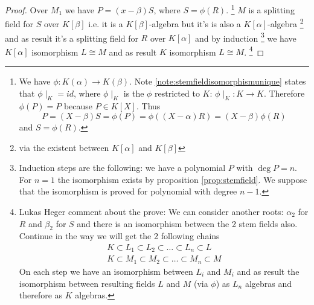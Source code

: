 \begin{theorem}
\begin{proof}
    Over $M_1$ we have $P = (x - \beta) S$, where
    $S = \phi\left(R\right)$.
    \footnote{
      We have $\phi: K\left(\alpha\right) \to
      K\left(\beta\right)$. Note \ref{note:stemfieldisomorphismunique}
      states that $\phi\mid_K = id$, where $\phi\mid_K$ is the $\phi$
      restricted to $K$: $\phi\mid_K : K \to K$.
      Therefore
      $\phi\left(P\right) = P$ because $P \in K\left[X\right]$.
      Thus
      \[
      P = (X - \beta) S = \phi\left(P\right) =
      \phi\left((X - \alpha) R\right) =
      (X - \beta) \phi\left(R\right)
      \]
      and $S = \phi\left(R\right)$.
    }
    $M$ is a splitting field for $S$ over $K\left[\beta\right]$
    i.e. it is a $K\left[\beta\right]$-algebra but it's is also
    a $K\left[\alpha\right]$-algebra
    \footnote{
      via
      the existent 
      between $K\left[\alpha\right]$ and $K\left[\beta\right]$
    }
    and as 
    result it's a splitting field for $R$ over $K\left[\alpha\right]$
    and by induction
    \footnote{
      Induction steps are the following: we have a polynomial $P$ with
      $\deg P = n$. For $n=1$ the isomorphism exists by proposition
      \ref{prop:stemfield}.
      We suppose that the isomorphism is proved for
      polynomial with degree $n-1$.
    }
    we have $K\left[\alpha\right]$ isomorphism $L \cong M$ and as
    result $K$ isomorphism $L \cong M$.
    \footnote{
      Lukas Heger comment about the prove:
      We can consider 
      another roots: $\alpha_2$ for $R$ and $\beta_2$ for $S$
      and there is an isomorphism between the 2 stem fields
      also. Continue in the way we will get the 2 following chains
      \begin{eqnarray}
        K \subset L_1 \subset L_2 \subset \dots \subset L_n \subset L
        \nonumber \\
        K \subset M_1 \subset M_2 \subset \dots \subset M_n \subset M
        \nonumber
      \end{eqnarray}
      On each step we have an isomorphism between $L_i$ and $M_i$ and as
      result the isomorphism between resulting fields $L$ and $M$ (via
      $\phi$) as $L_n$ algebras and therefore as $K$ algebras. 
    }
  \end{proof}
\end{theorem}

